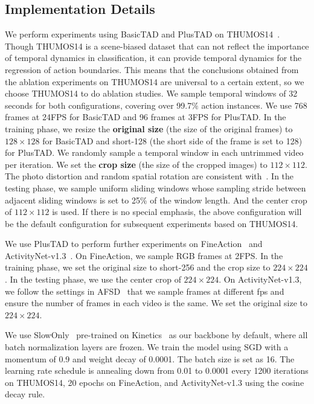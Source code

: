\documentclass[a4paper,fleqn]{cas-dc}
\begin{document}
\subsection{Implementation Details}
We perform experiments using BasicTAD and PlusTAD on THUMOS14~\citep{THUMOS14}. Though THUMOS14 is a scene-biased dataset that can not reflect the importance of temporal dynamics in classification, it can provide temporal dynamics for the regression of action boundaries. This means that the conclusions obtained from the ablation experiments on THUMOS14 are universal to a certain extent, so we choose THUMOS14 to do ablation studies. 
We sample temporal windows of 32 seconds for both configurations, covering over 99.7$\%$ action instances. 
We use 768 frames at 24FPS for BasicTAD and 96 frames at 3FPS for PlusTAD. 
In the training phase, we resize the \textbf{original size} (the size of the original frames) to $128\times128$ for BasicTAD and short-128 (the short side of the frame is set to 128) for PlusTAD. 
We randomly sample a temporal window in each untrimmed video per iteration.
We set the \textbf{crop size} (the size of the cropped images) to $112\times112$. 
The photo distortion and random spatial rotation are consistent with~\citep{rgb_enough,ssd}.
In the testing phase, we sample uniform sliding windows whose sampling stride between adjacent sliding windows is set to 25\% of the window length. 
And the center crop of $112\times112$ is used. 
If there is no special emphasis, the above configuration will be the default configuration for subsequent experiments based on THUMOS14.

We use PlusTAD to perform further experiments on FineAction~\citep{fineaction} and ActivityNet-v1.3~\citep{anet}.
On FineAction, we sample RGB frames at 2FPS. 
In the training phase, we set the original size to short-256 and the crop size to $224\times224$.
In the testing phase, we use the center crop of $224\times224$.
On ActivityNet-v1.3, we follow the settings in AFSD~\citep{afsd} that we sample frames at different fps and ensure the number of frames in each video is the same. We set the original size to $224\times224$.


We use SlowOnly~\citep{slowfast} pre-trained on Kinetics~\citep{kinetics} as our backbone by default, where all batch normalization layers are frozen.
We train the model using SGD with a momentum of 0.9 and weight decay of 0.0001. The batch size is set as 16.
The learning rate schedule is annealing down from 0.01 to 0.0001 every 1200 iterations on THUMOS14, 20 epochs on FineAction, and ActivityNet-v1.3 using the cosine decay rule.
\end{document}

